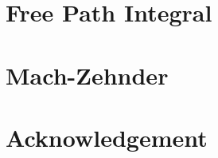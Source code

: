 \documentclass[10pt, a4paper]{article}
\begin{document}
\section{Free Path Integral}

\section{Mach-Zehnder}


\section{Acknowledgement}

\makereferences


\end{document}
